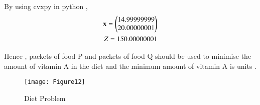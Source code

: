 \documentclass[journal,12pt,twocolumn]{IEEEtran}
\begin{document}
By using cvxpy in python ,
\begin{align}
    \mathbf{x}=\begin{pmatrix}14.99999999\\20.00000001\end{pmatrix}\\
    Z = 150.00000001
\end{align}

Hence , packets of food P and  packets of food Q should be used to minimise the amount of vitamin A in the diet and the minimum amount of vitamin A is  units .

\begin{figure}[!ht]
\centering
\texttt{[image: Figure12]}
\caption{Diet Problem}
\label{fig:diet problem}	
\end{figure}
\end{document}

